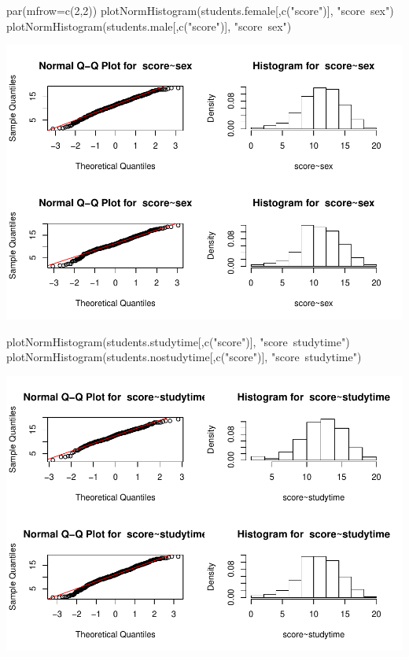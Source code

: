 \documentclass[]{article}
\newenvironment{Shaded}{\begin{snugshade}}{\end{snugshade}}
\newcommand{\DataTypeTok}[1]{\textcolor[rgb]{0.87,0.87,0.75}{#1}}
\newcommand{\DecValTok}[1]{\textcolor[rgb]{0.86,0.86,0.80}{#1}}
\newcommand{\KeywordTok}[1]{\textcolor[rgb]{0.94,0.87,0.69}{#1}}
\newcommand{\NormalTok}[1]{\textcolor[rgb]{0.80,0.80,0.80}{#1}}
\newcommand{\StringTok}[1]{\textcolor[rgb]{0.80,0.58,0.58}{#1}}
\begin{document}
\begin{Shaded}
\begin{Highlighting}[]
\KeywordTok{par}\NormalTok{(}\DataTypeTok{mfrow=}\KeywordTok{c}\NormalTok{(}\DecValTok{2}\NormalTok{,}\DecValTok{2}\NormalTok{))}
\KeywordTok{plotNormHistogram}\NormalTok{(students.female[,}\KeywordTok{c}\NormalTok{(}\StringTok{"score"}\NormalTok{)], }\StringTok{"score~sex"}\NormalTok{)}
\KeywordTok{plotNormHistogram}\NormalTok{(students.male[,}\KeywordTok{c}\NormalTok{(}\StringTok{"score"}\NormalTok{)], }\StringTok{"score~sex"}\NormalTok{)}
\end{Highlighting}
\end{Shaded}

\includegraphics{Practica2_files/figure-latex/unnamed-chunk-42-1.pdf}

\begin{Shaded}
\begin{Highlighting}[]
\KeywordTok{plotNormHistogram}\NormalTok{(students.studytime[,}\KeywordTok{c}\NormalTok{(}\StringTok{"score"}\NormalTok{)], }\StringTok{"score~studytime"}\NormalTok{)}
\KeywordTok{plotNormHistogram}\NormalTok{(students.nostudytime[,}\KeywordTok{c}\NormalTok{(}\StringTok{"score"}\NormalTok{)], }\StringTok{"score~studytime"}\NormalTok{)}
\end{Highlighting}
\end{Shaded}

\includegraphics{Practica2_files/figure-latex/unnamed-chunk-42-2.pdf}
\end{document}
